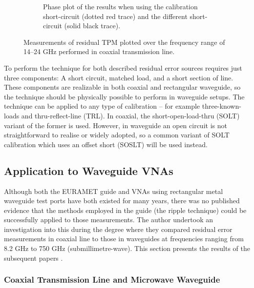 \documentclass[../thesis/thesis.tex]{subfiles}
\begin{document}
\begin{refsection}
\begin{figure}
\begin{subfigure}{0.6\textwidth}
		\caption{Phase plot of the results when using the calibration short-circuit (dotted red trace) and the different short-circuit (solid black trace).}
	\end{subfigure}
	\caption{Measurements of residual TPM plotted over the frequency range of  14--24 GHz performed in coaxial transmission line.}
	\label{ch4_fig_tpm}
\end{figure}

To perform the technique for both described residual error sources requires just three components: A short circuit, matched load, and a short section of line. These components are realizable in both coaxial and rectangular waveguide, so the technique should be physically possible to perform in waveguide setups. The technique can be applied to any type of calibration – for example three-known-loads and thru-reflect-line (TRL). In coaxial, the short-open-load-thru (SOLT) variant of the former is used. However, in waveguide an open circuit is not straightforward to realise or widely adopted, so a common variant of SOLT calibration which uses an offset short (SOSLT) will be used instead.

\subsection{Application to Waveguide VNAs}

Although both the EURAMET guide and VNAs using rectangular metal waveguide test ports have both existed for many years, there was no published evidence that the methods employed in the guide (the ripple technique) could be successfully applied to those measurements. The author undertook an investigation into this during the degree where they compared residual error measurements in coaxial line to those in waveguides at frequencies ranging from 8.2 GHz to 750 GHz (submillimetre-wave). This section presents the results of the subsequent papers \cite{Stant_2016_Coll, Stant_2017}.

\subsubsection{Coaxial Transmission Line and Microwave Waveguide}


\end{refsection}
\end{document}
